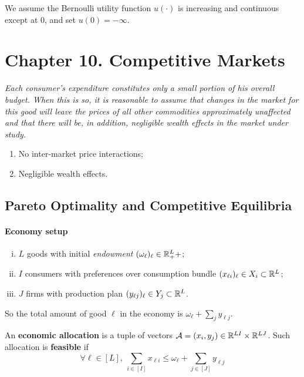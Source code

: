 \documentclass{article}
\begin{document}
	 		\begin{assumption}
	 			We assume the Bernoulli utility function $u(\cdot)$ is increasing and continuous except at $0$, and set $u(0) = -\infty$.
	 		\end{assumption}
	 		
	 \section{Chapter 10. Competitive Markets}
	 	\begin{assumption}
	 		\emph{Each consumer's expenditure constitutes only a small portion of his overall budget. When this is so, it is reasonable to assume that changes in the market for this good will leave the prices of all other commodities approximately unaffected and that there will be, in addition, negligible wealth effects in the market under study.}
	 		\begin{enumerate}
	 			\item No inter-market price interactions;
	 			\item Negligible wealth effects.
	 		\end{enumerate}
	 	\end{assumption}
	 	
	 	\subsection{Pareto Optimality and Competitive Equilibria}
	 	\paragraph{Economy setup}
	 	\begin{enumerate}[(i)]
	 		\item $L$ goods with initial \emph{endowment} $(\omega_\ell)_\ell \in \mathbb{R}^L_++$;
	 		\item $I$ consumers with preferences over consumption bundle $(x_{\ell i})_\ell \in X_i \subset \mathbb{R}^L$;
	 		\item $J$ firms with production plan $(y_{\ell j})_\ell \in Y_j \subset \mathbb{R}^L$.
	 	\end{enumerate}
	 	So the total amount of good $\ell$ in the economy is $\omega_\ell + \sum_j y_{\ell j}$.
	 	
	 	\begin{definition}[10.B.1]
	 		An \textbf{economic allocation} is a tuple of vectors $\mathcal{{A}} = (x_i, y_j) \in \mathbb{R}^{LI} \times \mathbb{R}^{LJ}$. Such allocation is \textbf{feasible} if
	 		\begin{equation}
	 			\forall \ell \in [L],\ \sum_{i \in [I]} x_{\ell i} \leq \omega_\ell + \sum_{j \in [J]} y_{\ell j}
	 		\end{equation}
	 	\end{definition}
	 	
\end{document}
